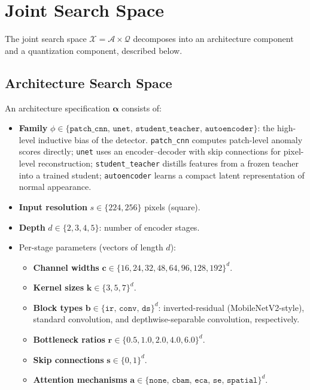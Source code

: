\documentclass[journal]{IEEEtran}
\newcommand{\calA}{\mathcal{A}}
\newcommand{\calQ}{\mathcal{Q}}
\newcommand{\calX}{\mathcal{X}}
\begin{document}
\section{Joint Search Space}
\label{sec:searchspace}

The joint search space $\calX = \calA \times \calQ$ decomposes into an
architecture component and a quantization component, described below.

\subsection{Architecture Search Space}
\label{sec:arch_space}

An architecture specification $\bm{\alpha}$ consists of:

\begin{itemize}
\item \textbf{Family} $\phi \in \{\texttt{patch\_cnn},\, \texttt{unet},\,
  \texttt{student\_teacher},\, \texttt{autoencoder}\}$: the high-level
  inductive bias of the detector.
  \texttt{patch\_cnn} computes patch-level anomaly scores directly;
  \texttt{unet} uses an encoder--decoder with skip connections for
  pixel-level reconstruction; \texttt{student\_teacher} distills features
  from a frozen teacher into a trained student;
  \texttt{autoencoder} learns a compact latent representation of normal
  appearance.
\item \textbf{Input resolution} $s \in \{224, 256\}$ pixels (square).
\item \textbf{Depth} $d \in \{2, 3, 4, 5\}$: number of encoder stages.
\item Per-stage parameters (vectors of length $d$):
  \begin{itemize}
    \item \textbf{Channel widths} $\bm{c} \in \{16, 24, 32, 48, 64, 96, 128, 192\}^d$.
    \item \textbf{Kernel sizes} $\bm{k} \in \{3, 5, 7\}^d$.
    \item \textbf{Block types} $\bm{b} \in \{\texttt{ir},\,
      \texttt{conv},\, \texttt{ds}\}^d$:
      inverted-residual (MobileNetV2-style), standard convolution, and
      depthwise-separable convolution, respectively.
    \item \textbf{Bottleneck ratios} $\bm{r} \in \{0.5, 1.0, 2.0, 4.0, 6.0\}^d$.
    \item \textbf{Skip connections} $\bm{s} \in \{0, 1\}^d$.
    \item \textbf{Attention mechanisms}
      $\bm{a} \in \{\texttt{none},\, \texttt{cbam},\, \texttt{eca},\,
      \texttt{se},\, \texttt{spatial}\}^d$.
  \end{itemize}
\end{itemize}
\end{document}
